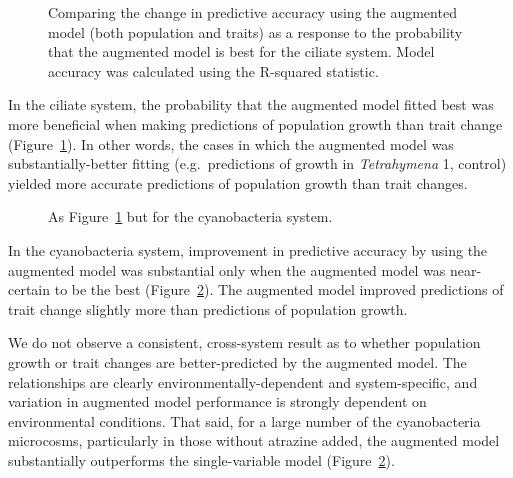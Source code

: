 \documentclass[
  letterpaper,
  DIV=11,
  numbers=noendperiod]{scrartcl}
\begin{document}
\begin{figure}


\caption{\label{fig-cilia-AIC-deltaerror}Comparing the change in
predictive accuracy using the augmented model (both population and
traits) as a response to the probability that the augmented model is
best for the ciliate system. Model accuracy was calculated using the
R-squared statistic.}

\end{figure}%

In the ciliate system, the probability that the augmented model fitted
best was more beneficial when making predictions of population growth
than trait change (Figure~\ref{fig-cilia-AIC-deltaerror}). In other
words, the cases in which the augmented model was substantially-better
fitting (e.g.~predictions of growth in \emph{Tetrahymena} 1, control)
yielded more accurate predictions of population growth than trait
changes.

\begin{figure}


\caption{\label{fig-cyano-AIC-deltaerror}As
Figure~\ref{fig-cilia-AIC-deltaerror} but for the cyanobacteria system.}

\end{figure}%

In the cyanobacteria system, improvement in predictive accuracy by using
the augmented model was substantial only when the augmented model was
near-certain to be the best (Figure~\ref{fig-cyano-AIC-deltaerror}). The
augmented model improved predictions of trait change slightly more than
predictions of population growth.

We do not observe a consistent, cross-system result as to whether
population growth or trait changes are better-predicted by the augmented
model. The relationships are clearly environmentally-dependent and
system-specific, and variation in augmented model performance is
strongly dependent on environmental conditions. That said, for a large
number of the cyanobacteria microcosms, particularly in those without
atrazine added, the augmented model substantially outperforms the
single-variable model (Figure~\ref{fig-cyano-AIC-deltaerror}).
\end{document}
